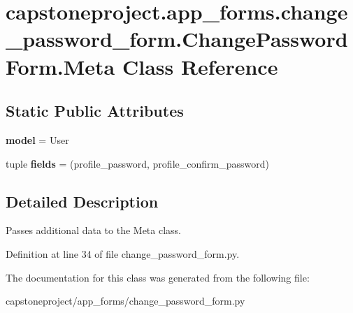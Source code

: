 \hypertarget{classcapstoneproject_1_1app__forms_1_1change__password__form_1_1_change_password_form_1_1_meta}{}\section{capstoneproject.\+app\+\_\+forms.\+change\+\_\+password\+\_\+form.\+Change\+Password\+Form.\+Meta Class Reference}
\label{classcapstoneproject_1_1app__forms_1_1change__password__form_1_1_change_password_form_1_1_meta}
\subsection*{Static Public Attributes}
\begin{DoxyCompactItemize}
\item 
\mbox{\label{classcapstoneproject_1_1app__forms_1_1change__password__form_1_1_change_password_form_1_1_meta_ae0e7dadd603c29f29f5c19cc80af0565}} 
{\bfseries model} = User
\item 
\mbox{\label{classcapstoneproject_1_1app__forms_1_1change__password__form_1_1_change_password_form_1_1_meta_a9fb06ae0d5d6fe5f8576d827f8ff8dd6}} 
tuple {\bfseries fields} = (\textquotesingle{}profile\+\_\+password\textquotesingle{}, \textquotesingle{}profile\+\_\+confirm\+\_\+password\textquotesingle{})
\end{DoxyCompactItemize}


\subsection{Detailed Description}
\begin{DoxyVerb}Passes additional data to the Meta class.
\end{DoxyVerb}
 

Definition at line 34 of file change\+\_\+password\+\_\+form.\+py.



The documentation for this class was generated from the following file\+:\begin{DoxyCompactItemize}
\item 
capstoneproject/app\+\_\+forms/change\+\_\+password\+\_\+form.\+py\end{DoxyCompactItemize}
